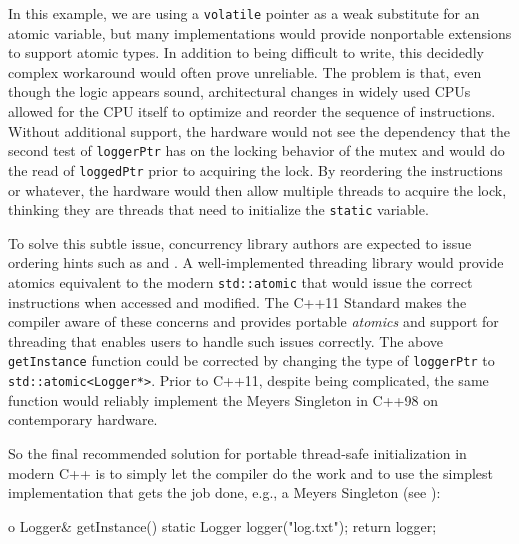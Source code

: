 \noindent In this example, we are using a \lstinline!volatile! pointer as a weak
substitute for an atomic variable, but many implementations would
provide nonportable extensions to support atomic types. In addition to
being difficult to write, this decidedly complex workaround would often
prove unreliable. The problem is that, even though the logic appears
sound, architectural changes in widely used CPUs allowed for the CPU
itself to optimize and reorder the sequence of instructions. Without
additional support, the hardware would not see the dependency that the
second test of \lstinline!loggerPtr! has on the locking behavior of the
mutex and would do the read of \lstinline!loggedPtr! prior to acquiring the
lock. By reordering the instructions or whatever, the hardware
would then allow multiple threads to acquire the lock, thinking they are
threads that need to initialize the \lstinline!static! variable.

To solve this subtle issue, concurrency library authors are expected to
issue ordering hints such as  and . A
well-implemented threading library would provide atomics equivalent to
the modern \lstinline!std::atomic! that would issue the correct
instructions when accessed and modified. The C++11 Standard makes the
compiler aware of these concerns and provides portable \emph{atomics}
and support for threading that enables users to handle such issues
correctly. The above \lstinline!getInstance! function could be corrected by
changing the type of \lstinline!loggerPtr! to
\lstinline!std::atomic<Logger*>!. Prior to C++11, despite being
complicated, the same function would reliably implement the Meyers
Singleton in C++98 on contemporary hardware.

\enlargethispage*{2ex} %
So the final recommended solution for portable thread-safe
initialization in modern C++ is to simply let the compiler do the work
and to use the simplest implementation that gets the job done, e.g., a
Meyers Singleton (see ):

\begin{emcppslisting}[emcppsbatch=e17]o
Logger& getInstance()
{
    static Logger logger("log.txt");
    return logger;
}
\end{emcppslisting}


